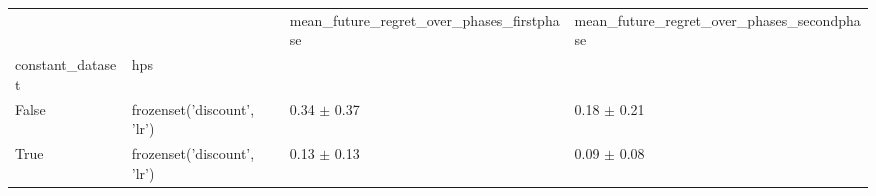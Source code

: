 \begin{tabular}{llll}
\toprule
 &  & mean_future_regret_over_phases_firstphase & mean_future_regret_over_phases_secondphase \\
constant_dataset & hps &  &  \\
\midrule
False & frozenset({'discount', 'lr'}) & 0.34 $\pm$ 0.37 & 0.18 $\pm$ 0.21 \\
\cline{1-4}
True & frozenset({'discount', 'lr'}) & 0.13 $\pm$ 0.13 & 0.09 $\pm$ 0.08 \\
\cline{1-4}
\bottomrule
\end{tabular}
